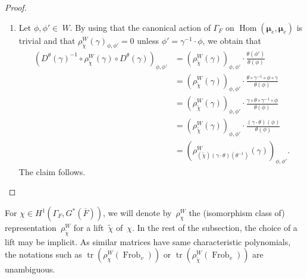 \documentclass[a4paper,english,12pt]{amsart}
\newcommand{\oF}{\overline F}
\newcommand{\wchi}{\widetilde{\chi}}
\newcommand{\muu}{\boldsymbol{\mu}}
\DeclareMathOperator{\Hom}{Hom}
\DeclareMathOperator{\tr}{tr}
\DeclareMathOperator{\Frob}{Frob}
\numberwithin{equation}{subsection}
\begin{document}
\begin{proof}
\begin{enumerate}
\item Let $\phi,\phi'\in~W$. By using that the canonical action of $\Gamma_F$ on $\Hom(\muu_e,\muu_e)$ is trivial and that $\rho^W_{\wchi}(\gamma)_{\phi, \phi'}=0$ unless $\phi'=\gamma^{-1}\cdot\phi$, we obtain that
\begin{align*}
(D^{\theta}(\gamma)^{-1}\circ \rho^W_{\widetilde\chi}(\gamma)\circ D^{\theta}(\gamma))_{\phi,\phi'}&=(\rho^W_{\widetilde\chi}(\gamma))_{\phi,\phi'}\cdot\frac{\theta(\phi')}{\theta (\phi)}\\
&=(\rho^W_{\widetilde\chi}(\gamma))_{\phi,\phi'}\cdot \frac{\theta\circ\gamma^{-1}\circ\phi\circ\gamma}{\theta(\phi)}\\
&=(\rho^W_{\widetilde\chi}(\gamma))_{\phi,\phi'}\cdot\frac{\gamma\circ\theta\circ\gamma^{-1}\circ\phi}{\theta(\phi)}\\
&=(\rho^W_{\widetilde\chi}(\gamma))_{\phi,\phi'}\cdot\frac{(\gamma\cdot \theta)(\phi)}{\theta(\phi)}\\
&=(\rho^W_{(\widetilde\chi)(\gamma\cdot\theta)(\theta^{-1})}(\gamma))_{\phi,\phi'}.
\end{align*}
The claim follows.
\end{enumerate}
\end{proof}
For $\chi\in H^1(\Gamma_F, G^*(\oF))$, we will denote by~$\rho^W_{\chi}$ the (isomorphism class of) representation~$\rho^W_{\widetilde\chi}$ for a lift~$\widetilde\chi$ of~$\chi$. In the rest of the subsection, the choice of a lift may be implicit. As similar matrices have same characteristic polynomials, the notations such as $\tr(\rho^W_{\chi}(\Frob_v))$ or $\tr(\rho^W_{\wchi}(\Frob_v))$ are unambiguous. 
\end{document}

